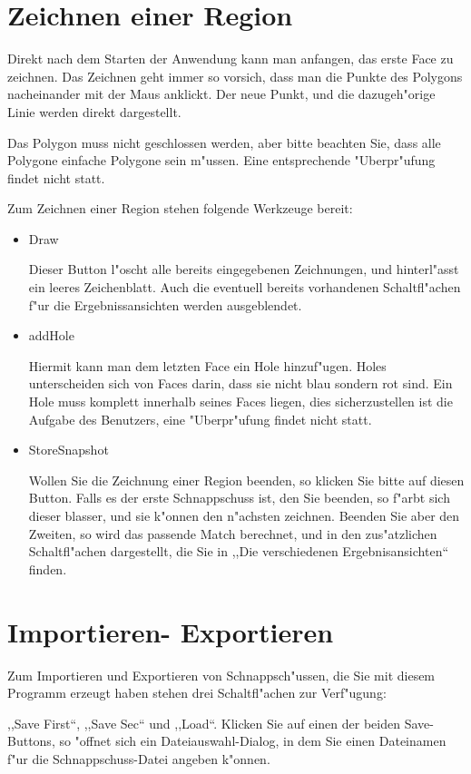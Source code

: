 \section{Zeichnen einer Region}
\setcounter{section}{1}
Direkt nach dem Starten der Anwendung kann man anfangen, das erste Face zu zeichnen.  Das Zeichnen geht immer so vorsich, dass man die Punkte des Polygons nacheinander mit der Maus anklickt. Der neue Punkt, und die dazugeh"orige Linie werden direkt dargestellt. 

Das Polygon muss nicht geschlossen werden, aber bitte beachten Sie, dass alle Polygone einfache Polygone sein m"ussen. Eine entsprechende "Uberpr"ufung findet nicht statt.

Zum Zeichnen einer Region stehen folgende Werkzeuge bereit:
\begin{itemize}
\item Draw

Dieser Button l"oscht alle bereits eingegebenen Zeichnungen, und hinterl"asst ein leeres Zeichenblatt. Auch die eventuell bereits vorhandenen Schaltfl"achen f"ur die Ergebnissansichten werden ausgeblendet.
\item addHole

Hiermit kann man dem letzten Face ein Hole hinzuf"ugen. Holes unterscheiden sich von Faces darin, dass sie nicht blau sondern rot sind. Ein Hole muss komplett innerhalb seines Faces liegen, dies sicherzustellen ist die Aufgabe des Benutzers, eine "Uberpr"ufung findet nicht statt.
\item StoreSnapshot

Wollen Sie die Zeichnung einer Region beenden, so klicken Sie bitte auf diesen Button. Falls es der erste Schnappschuss ist, den Sie beenden, so f"arbt sich dieser blasser, und sie k"onnen den n"achsten zeichnen. Beenden Sie aber den Zweiten, so wird das passende Match berechnet, und in den zus"atzlichen Schaltfl"achen dargestellt, die Sie in ,,Die verschiedenen Ergebnisansichten`` finden.
\end{itemize} 
\section{Importieren- Exportieren}
Zum Importieren und Exportieren von Schnappsch"ussen, die Sie mit diesem Programm erzeugt haben stehen drei Schaltfl"achen zur Verf"ugung:

,,Save First``, ,,Save Sec`` und ,,Load``. Klicken Sie auf einen der beiden Save-Buttons, so "offnet sich ein Dateiauswahl-Dialog, in dem Sie einen Dateinamen f"ur die Schnappschuss-Datei angeben k"onnen.

